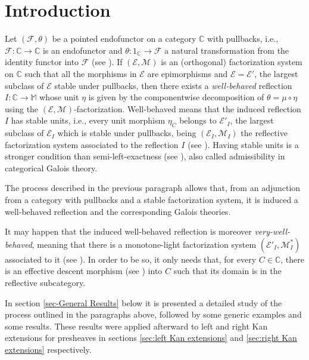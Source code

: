 \documentclass[12pt,a4paper]{amsart}
\theoremstyle{definition}
\begin{document}
\section{Introduction}\label{sec-introduction}

Let $(\mathcal{F},\theta)$ be a pointed endofunctor on a category $\mathbb{C}$ with pullbacks, i.e., $\mathcal{F}:\mathbb{C}\rightarrow \mathbb{C}$ is an endofunctor and $\theta:1_\mathbb{C}\rightarrow \mathcal{F}$ a natural transformation from the identity functor into $\mathcal{F}$ (see \cite[\S 1.1]{for:ins:sep:factorization}). If $(\mathcal{E},\mathcal{M})$ is an (orthogonal) factorization system on $\mathbb{C}$ such that all the morphisms in $\mathcal{E}$ are epimorphisms and $\mathcal{E}=\mathcal{E}'$, the largest subclass of $\mathcal{E}$ stable under pullbacks, then there exists a \emph{well-behaved} reflection $I:\mathbb{C}\rightarrow \mathbb{M}$ whose unit $\eta$ is given by the componentwise decomposition of $\theta=\mu\circ\eta$ using the $(\mathcal{E},\mathcal{M})$-factorization. Well-behaved means that the induced reflection $I$ has stable units, i.e., every unit morphism $\eta_C$ belongs to $\mathcal{E}'_I$, the largest subclass of $\mathcal{E}_I$ which is stable under pullbacks, being $(\mathcal{E}_I,\mathcal{M}_I)$ the reflective factorization system associated to the reflection $I$ (see \cite{CJKP:stab}). Having stable units is a stronger condition than semi-left-exactness (see \cite{CHK:fact}), also called admissibility in categorical Galois theory.

The process described in the previous paragraph allows that, from an adjunction from a category with pullbacks and a stable factorization system, it is induced a well-behaved reflection and the corresponding Galois theories.

It may happen that the induced well-behaved reflection is moreover \emph{very-well-behaved}, meaning that there is a monotone-light factorization system $(\mathcal{E}'_I,\mathcal{M}^*_I)$ associated to it (see \cite{CJKP:stab}). In order to be so, it only needs that, for every $C\in\mathbb{C}$, there is an effective descent morphism (see \cite{JST:edm}) into $C$ such that its domain is in the reflective subcategory.

In section \ref{sec-General Results} below it is presented a detailed study of the process outlined in the paragraphs above, followed by some generic examples and some results. These results were applied afterward to left and right Kan extensions for presheaves in sections \ref{sec:left Kan extensions} and \ref{sec:right Kan extensions} respectively.
\end{document}
